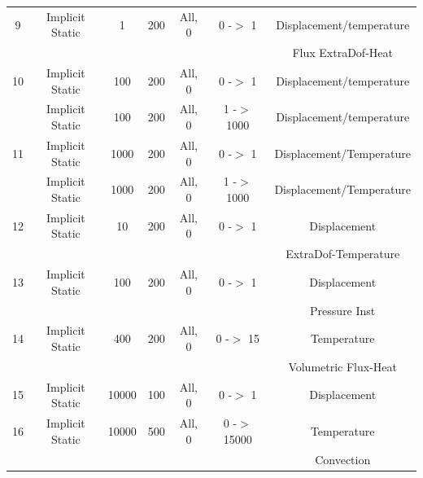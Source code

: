 \documentclass[oneside,11pt,times]{book}
\begin{document}
\begin{table}[h!]
\begin{tabular}{|c|c|c|c|c|c|c|}
    \hline
    9 & Implicit Static & 1 & 200 & All, 0 & 0 -$>$ 1 & Displacement/temperature\\
     & & & & & & Flux ExtraDof-Heat\\
    \hline
    10 & Implicit Static & 100 & 200 & All, 0 & 0 -$>$ 1 & Displacement/temperature\\
     & Implicit Static & 100 & 200 & All, 0 & 1 -$>$ 1000 & Displacement/temperature\\
    \hline
    11 & Implicit Static & 1000 & 200 & All, 0 & 0 -$>$ 1 & Displacement/Temperature\\
     & Implicit Static & 1000 & 200 & All, 0 & 1 -$>$ 1000 & Displacement/Temperature\\
    \hline
    12 & Implicit Static & 10 & 200 & All, 0 & 0 -$>$ 1 & Displacement\\
     & & & & & &  ExtraDof-Temperature\\
    \hline
     13 & Implicit Static & 100 & 200 & All, 0 & 0 -$>$ 1 & Displacement\\
     & & & & & &  Pressure Inst \\
     \hline
     14 & Implicit Static & 400 & 200 & All, 0 & 0 -$>$ 15 & Temperature\\
     & & & & & &  Volumetric Flux-Heat \\
    \hline
    15 & Implicit Static & 10000 & 100 & All, 0 & 0 -$>$ 1 & Displacement\\
    \hline
    16 & Implicit Static & 10000 & 500 & All, 0 & 0 -$>$ 15000 & Temperature\\
     & & & & & &
    Convection\\
    \hline
    \end{tabular}
\end{table}
\end{document}

